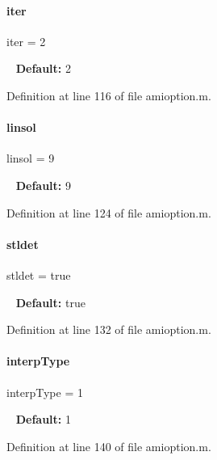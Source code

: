\paragraph{\texorpdfstring{iter}{iter}}
{\footnotesize\ttfamily iter = 2}

~\newline
{\bfseries{Default\+:}} 2 

Definition at line 116 of file amioption.\+m.

\mbox{\label{classamioption_a06749b49eaa313f4d00f0115d3a7a7f3}} 
\paragraph{\texorpdfstring{linsol}{linsol}}
{\footnotesize\ttfamily linsol = 9}

~\newline
{\bfseries{Default\+:}} 9 

Definition at line 124 of file amioption.\+m.

\mbox{\label{classamioption_a202e02f7d8c1a87b1c675bcc1acf1c8e}} 
\paragraph{\texorpdfstring{stldet}{stldet}}
{\footnotesize\ttfamily stldet = true}

~\newline
{\bfseries{Default\+:}} true 

Definition at line 132 of file amioption.\+m.

\mbox{\label{classamioption_ad06cc805fa18b06ac937fd98a9eba0e7}} 
\paragraph{\texorpdfstring{interpType}{interpType}}
{\footnotesize\ttfamily interp\+Type = 1}

~\newline
{\bfseries{Default\+:}} 1 

Definition at line 140 of file amioption.\+m.


